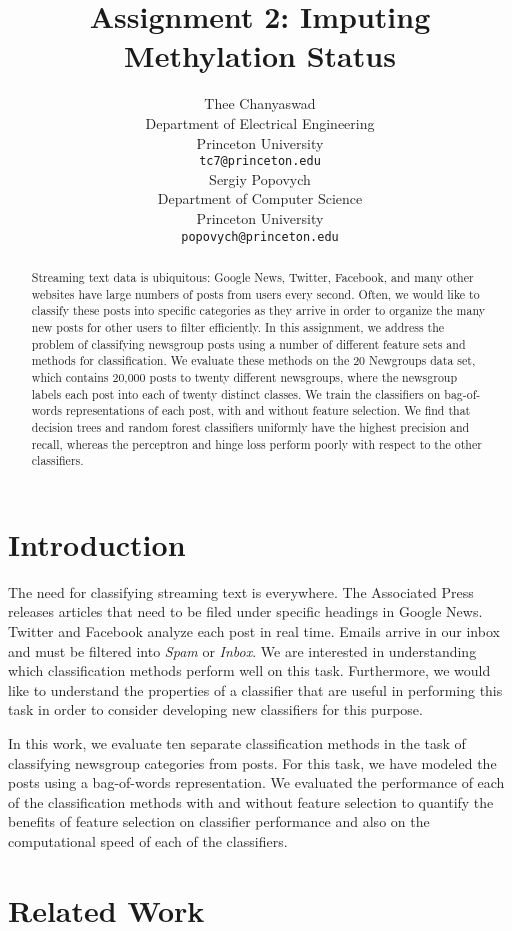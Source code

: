 \documentclass{article} %
\title{Assignment 2: Imputing Methylation Status}
\author{
Thee Chanyaswad\\
Department of Electrical Engineering\\
Princeton University\\
\texttt{tc7@princeton.edu} \\
\And
Sergiy Popovych\\
Department of Computer Science\\
Princeton University\\
\texttt{popovych@princeton.edu} \\
}
\begin{document}
\maketitle

\begin{abstract}
Streaming text data is ubiquitous: Google News, Twitter, Facebook, and many other websites have large numbers of posts from users every second. Often, we would like to classify these posts into specific categories as they arrive in order to organize the many new posts for other users to filter efficiently. In this assignment, we address the problem of classifying newsgroup posts using a number of different feature sets and methods for classification. We evaluate these methods on the 20 Newgroups data set, which contains 20,000 posts to twenty different newsgroups, where the newsgroup labels each post into each of twenty distinct classes. We train the classifiers on bag-of-words representations of each post, with and without feature selection. We find that decision trees and random forest classifiers uniformly have the highest precision and recall, whereas the perceptron and hinge loss perform poorly with respect to the other classifiers.
\end{abstract}
\section{Introduction}

The need for classifying streaming text is everywhere. The Associated Press releases articles that need to be filed under specific headings in Google News. Twitter and Facebook analyze each post in real time. Emails arrive in our inbox and must be filtered into \emph{Spam} or \emph{Inbox}. We are interested in understanding which classification methods perform well on this task. Furthermore, we would like to understand the properties of a classifier that are useful in performing this task in order to consider developing new classifiers for this purpose.

In this work, we evaluate ten separate classification methods in the task of classifying newsgroup categories from posts. For this task, we have modeled the posts using a bag-of-words representation. We evaluated the performance of each of the classification methods with and without feature selection to quantify the benefits of feature selection on classifier performance and also on the computational speed of each of the classifiers.

\section{Related Work}
\end{document}
